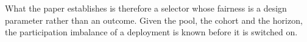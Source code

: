 \documentclass[journal]{IEEEtran}
\newcommand{\rev}[1]{{\color{blue}#1}}
\begin{document}
\rev{What the paper establishes is therefore a selector whose fairness is a design parameter rather than an outcome. Given the pool, the cohort and the horizon, the participation imbalance of a deployment is known before it is switched on.}

\balance

{\setlength{\itemsep}{0pt plus 0.2ex}\setlength{\parsep}{0pt}
}
\end{document}
